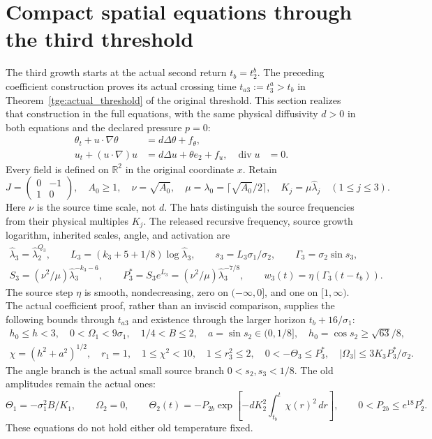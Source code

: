 \section{Compact spatial equations through the third threshold}
\label{tgs:section}

The third growth starts at the actual second return $t_b=t_2^b$.
The preceding coefficient construction proves its actual crossing time
$t_{a3}:=t_3^a>t_b$ in Theorem~\ref{tge:actual_threshold} of the
original threshold. This section realizes that
construction in the full equations, with the same physical diffusivity
$d>0$ in both equations and the declared pressure $p=0$:
\[
\begin{aligned}
 \theta_t+u\cdot\nabla\theta&=d\Delta\theta+f_\theta,\\
 u_t+(u\cdot\nabla)u&=d\Delta u+\theta e_2+f_u,
 &\operatorname{div}u&=0.
\end{aligned}
\]
Every field is defined on $\mathbb R^2$ in the original coordinate $x$.
Retain
\[
 J=\begin{pmatrix}0&-1\\1&0\end{pmatrix},\quad
 A_0\geq1,\quad\nu=\sqrt{A_0},\quad
 \mu=\lambda_0=\lceil\sqrt{A_0}/2\rceil,\quad
 K_j=\mu\widehat\lambda_j\quad(1\leq j\leq3).
\]
Here $\nu$ is the source time scale, not $d$. The hats distinguish
the source frequencies from their physical multiples $K_j$.
The released recursive frequency, source growth logarithm, inherited
scales, angle, and activation are
\begin{equation}\label{tgs:scales}
 \begin{gathered}
 \widehat\lambda_3=\widehat\lambda_2^{Q_3},\qquad
 L_3=(k_3+5+1/8)\log\widehat\lambda_3,\qquad
 s_3=L_3\sigma_1/\sigma_2,\qquad\Gamma_3=\sigma_2\sin s_3,\\
 S_3=(\nu^2/\mu)\widehat\lambda_3^{-k_3-6},\qquad
 P_3^*=S_3e^{L_3}=(\nu^2/\mu)\widehat\lambda_3^{-7/8},\qquad
 w_3(t)=\eta(\Gamma_3(t-t_b)).
 \end{gathered}
\end{equation}
The source step $\eta$ is smooth, nondecreasing, zero on
$(-\infty,0]$, and one on $[1,\infty)$.
The actual coefficient proof, rather than an inviscid comparison,
supplies the following bounds through $t_{a3}$ and existence through
the larger horizon $t_b+16/\sigma_1$:
\begin{equation}\label{tgs:actualbounds}
 \begin{gathered}
 h_0\leq h<3,\quad 0<\Omega_1<9\sigma_1,\quad
 1/4<B\leq2,\quad a=\sin s_2\in(0,1/8],\quad
 h_0=\cos s_2\geq\sqrt{63}/8,\\
 \chi=(h^2+a^2)^{1/2},\quad r_1=1,\quad
 1\leq\chi^2<10,\quad 1\leq r_3^2\leq2,\quad
 0< -\Theta_3\leq P_3^*,\quad
 |\Omega_3|\leq3K_3P_3^*/\sigma_2.
 \end{gathered}
\end{equation}
The angle branch is the actual small source branch $0<s_2,s_3<1/8$.
The old amplitudes remain the actual ones:
\[
 \Theta_1=-\sigma_1^2B/K_1,\qquad
 \Omega_2=0,\qquad
 \Theta_2(t)=-P_{2b}\exp\!\left[-dK_2^2
                 \int_{t_b}^{t}\chi(r)^2\,dr\right],
 \qquad0<P_{2b}\leq e^{18}P_2^*.
\]
These equations do not hold either old temperature fixed.

